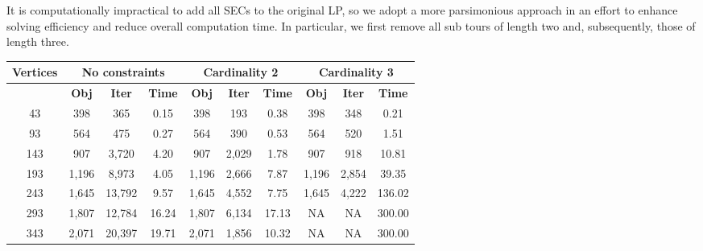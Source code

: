 \documentclass[12pt]{article}
\numberwithin{equation}{section}
\begin{document}
It is computationally impractical to add all SECs to the original LP, so we adopt a more parsimonious approach in an effort to enhance solving efficiency and reduce overall computation time. In particular, we first remove all sub tours of length two and, subsequently, those of length three.\\

\vspace{1em}


\begin{table}[!ht]
\centering
\begin{tabular}{|c|c|c|c|c|c|c|c|c|c|}
\hline
\textbf{Vertices} & \multicolumn{3}{c|}{\textbf{No constraints}} & \multicolumn{3}{c|}{\textbf{Cardinality 2}} & \multicolumn{3}{c|}{\textbf{Cardinality 3}} \\
\hline
 & \textbf{Obj} & \textbf{Iter} & \textbf{Time} & \textbf{Obj} & \textbf{Iter} & \textbf{Time} & \textbf{Obj} & \textbf{Iter} & \textbf{Time} \\
\hline
     43 &                  398 &                   365 &                  0.15 &                 398 &                  193 &                 0.38 &                 398 &                  348 &                 0.21 \\
      93 &                  564 &                   475 &                  0.27 &                 564 &                  390 &                 0.53 &                 564 &                  520 &                 1.51 \\
     143 &                  907 &                 3,720 &                  4.20 &                 907 &                2,029 &                 1.78 &                 907 &                  918 &                10.81 \\
     193 &                1,196 &                 8,973 &                  4.05 &               1,196 &                2,666 &                 7.87 &               1,196 &                2,854 &                39.35 \\
     243 &                1,645 &                13,792 &                  9.57 &               1,645 &                4,552 &                 7.75 &               1,645 &                4,222 &               136.02 \\
     293 &                1,807 &                12,784 &                 16.24 &               1,807 &                6,134 &                17.13 &                   NA &                    NA &               300.00 \\
     343 &                2,071 &                20,397 &                 19.71 &               2,071 &                1,856 &                10.32 &                   NA &                    NA &               300.00 \\

\end{tabular}
\end{table}
\end{document}
